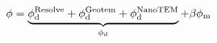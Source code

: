 \begin{equation}
\phi = \underbrace{\phi_{\rm d}^{\text{Resolve}} + \phi_{\rm d}^{\text{Geotem}} + \phi_{\rm d}^{\text{NanoTEM}}}_{\phi_{\rm d}} + \beta \phi_{\rm m}
\label{eq:combo-objective}
\end{equation}
